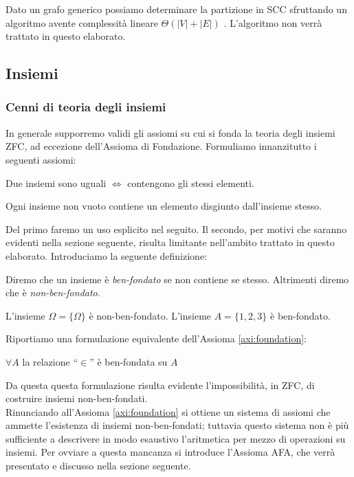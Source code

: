 Dato un grafo generico possiamo determinare la partizione in SCC sfruttando un algoritmo avente complessità lineare $\Theta(|V| + |E|)$ \cite{tarjan}. L'algoritmo non verrà trattato in questo elaborato.

\subsection{Insiemi}
\subsubsection{Cenni di teoria degli insiemi}
In generale supporremo validi gli assiomi su cui si fonda la teoria degli insiemi ZFC, ad eccezione dell'Assioma di Fondazione. Formuliamo innanzitutto i seguenti assiomi:
\begin{axiom}[di estensionalità]
    Due insiemi sono uguali $\iff$ contengono gli stessi elementi.
\end{axiom}
\begin{axiom}[di fondazione]
    Ogni insieme non vuoto contiene un elemento disgiunto dall'insieme stesso.
    \label{axi:foundation}
\end{axiom}
Del primo faremo un uso esplicito nel seguito. Il secondo, per motivi che saranno evidenti nella sezione seguente, risulta limitante nell'ambito trattato in questo elaborato. Introduciamo la seguente definizione:
\begin{definition}
    Diremo che un insieme è \emph{ben-fondato} se non contiene se stesso. Altrimenti diremo che è \emph{non-ben-fondato}.
\end{definition}
\begin{example}
    L'insieme $\Omega = \{\Omega\}$ è non-ben-fondato. L'insieme $A = \{1,2,3\}$ è ben-fondato.
\end{example}
Riportiamo una formulazione equivalente dell'Assioma \ref{axi:foundation}:
\begin{axiom*}
    $\forall A$ la relazione ``$\in$'' è ben-fondata su $A$ \cite[Chapter III.4]{kunen}
\end{axiom*}
Da questa questa formulazione risulta evidente l'impossibilità, in ZFC, di costruire insiemi non-ben-fondati.\\
Rinunciando all'Assioma \ref{axi:foundation} si ottiene un sistema di assiomi che ammette l'esistenza di insiemi non-ben-fondati; tuttavia questo sistema non è più sufficiente a descrivere in modo esaustivo l'aritmetica per mezzo di operazioni su insiemi. Per ovviare a questa mancanza si introduce l'Assioma AFA, che verrà presentato e discusso nella sezione seguente.

